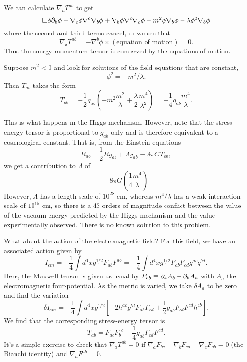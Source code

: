 We can calculate $\nabla_a T^{ab}$ to get%
\begin{equation*}
   \Box \phi \partial_b \phi + \nabla_c \phi \nabla^c \nabla_b \phi + \nabla_b \phi \nabla^c \nabla_c \phi - m^2 \phi \nabla_b \phi - \lambda \phi^3 \nabla_b \phi 
\end{equation*}
where the second and third terms cancel,%
so we see that
$$\nabla_a T^{ab}=-\nabla^b \phi \times (\text{equation of motion})=0.$$
Thus the energy-momentum tensor is conserved by the equations of motion.

Suppose $m^2 <0$ and look for solutions of the field equations that are constant,
$$\phi^2 = -m^2/\lambda.$$ Then $T_{ab}$ takes the form
$$T_{ab}=-\frac{1}{2}g_{ab}(-m^2 \frac{m^2}{\lambda}+\frac{\lambda}{2} \frac{m^4}{\lambda^2})= -\frac{1}{4}g_{ab} \frac{m^4}{\lambda}.$$

This is what happens in the Higgs mechanism. %
However, note that the stress-energy tensor is proportional to $g_{ab}$ only and is therefore equivalent to a cosmological constant. That is, from the Einstein equations
$$R_{ab}-\frac{1}{2}R g_{ab} +\Lambda g_{ab} = 8\pi G T_{ab},$$ 
we get a contribution to $\Lambda$ of
$$-8\pi G \left(\frac{1}{4} \frac{m^4}{\lambda}\right)$$ However, $\Lambda$ has a length scale of $10^{28}$ cm, whereas $m^4/\lambda$ has a weak interaction scale of $10^{15}$ cm, so there is a 43 orders of magnitude conflict between the value of the vacuum energy predicted by the Higgs mechanism and the value experimentally observed. There is no known solution to this problem.

What about the action of the electromagnetic field? For this field, we have an associated action given by
$$I_{em}=-\frac{1}{4}\int d^4x g^{1/2} F_{ab} F^{ab} = -\frac{1}{4}\int d^4x g^{1/2} F_{ab} F_{cd} g^{ac} g^{bd}.$$
Here, the Maxwell tensor is given as usual by $F_{ab}\equiv \partial_a A_b -\partial_b A_a$ with $A_a$ the electromagnetic four-potential. As the metric is varied, we take $\delta A_a$ to be zero and find the variation
$$\delta I_{em}=-\frac{1}{4} \int d^4x g^{1/2} [-2 h^{ac} g^{bd} F_{ab} F_{cd} + \frac{1}{2} g_{ab} F_{cd} F^{cd} h^{ab}].$$
We find that the corresponding stress-energy tensor is
$$T_{ab}=F_{ac} {F_b}^c - \frac{1}{4} g_{ab} F_{cd} F^{cd}.$$
It's a simple exercise to check that $\nabla_a T^{ab}=0$ if $\nabla_a F_{bc} + \nabla_b F_{ca} + \nabla_c F_{ab}=0$ (the Bianchi identity) and $\nabla_a F^{ab}=0$.

